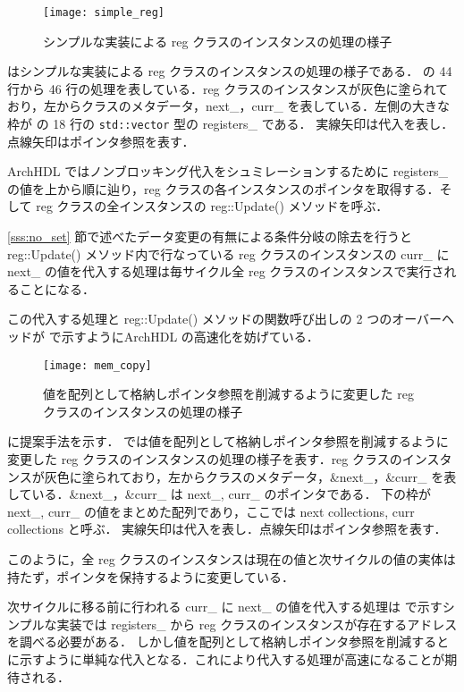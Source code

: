 \begin{figure}[t]
 \centering
 \texttt{[image: simple\_reg]}
 \caption{シンプルな実装による reg クラスのインスタンスの処理の様子}
 \label{fig:regs}
\end{figure}

 はシンプルな実装による reg クラスのインスタンスの処理の様子である．
の 44 行から 46 行の処理を表している．reg クラスのインスタンスが灰色に塗られており，左からクラスのメタデータ，next\_，curr\_
を表している．左側の大きな枠が の 18 行の \verb`std::vector` 型の registers\_ である．
実線矢印は代入を表し．点線矢印はポインタ参照を表す．

ArchHDL ではノンブロッキング代入をシュミレーションするために registers\_ の値を上から順に辿り，reg クラスの各インスタンスのポインタを取得する．そして reg クラスの全インスタンスの reg::Update() メソッドを呼ぶ．

\ref{sss:no_set} 節で述べたデータ変更の有無による条件分岐の除去を行うと
reg::Update() メソッド内で行なっている reg
クラスのインスタンスの curr\_ に next\_ の値を代入する処理は毎サイクル全
reg クラスのインスタンスで実行されることになる．

この代入する処理と reg::Update() メソッドの関数呼び出しの 2
つのオーバーヘッドが で示すようにArchHDL
の高速化を妨げている．

\begin{figure}[t]
 \centering
 \texttt{[image: mem\_copy]}
 \caption{値を配列として格納しポインタ参照を削減するように変更した reg クラスのインスタンスの処理の様子}
 \label{fig:mem_copy}
\end{figure}

 に提案手法を示す． では値を配列として格納しポインタ参照を削減するように変更した reg クラスのインスタンスの処理の様子を表す．reg クラスのインスタンスが灰色に塗られており，左からクラスのメタデータ，\&next\_，\&curr\_ を表している．\&next\_，\&curr\_ は next\_, curr\_ のポインタである．
下の枠が next\_, curr\_ の値をまとめた配列であり，ここでは next collections, curr collections と呼ぶ．
実線矢印は代入を表し．点線矢印はポインタ参照を表す．

このように，全 reg クラスのインスタンスは現在の値と次サイクルの値の実体は持たず，ポインタを保持するように変更している．

次サイクルに移る前に行われる curr\_ に next\_ の値を代入する処理は  で示すシンプルな実装では registers\_ から reg クラスのインスタンスが存在するアドレスを調べる必要がある．
しかし値を配列として格納しポインタ参照を削減すると  に示すように単純な代入となる．これにより代入する処理が高速になることが期待される．

